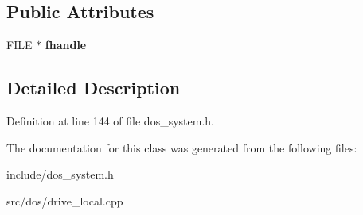 \subsection*{Public Attributes}
\begin{DoxyCompactItemize}
\item 
\hypertarget{classlocalFile_aef1f958f4d67ab5b261f7b8a3eff4ab4}{F\-I\-L\-E $\ast$ {\bfseries fhandle}}\label{classlocalFile_aef1f958f4d67ab5b261f7b8a3eff4ab4}

\end{DoxyCompactItemize}


\subsection{Detailed Description}


Definition at line 144 of file dos\-\_\-system.\-h.



The documentation for this class was generated from the following files\-:\begin{DoxyCompactItemize}
\item 
include/dos\-\_\-system.\-h\item 
src/dos/drive\-\_\-local.\-cpp\end{DoxyCompactItemize}
